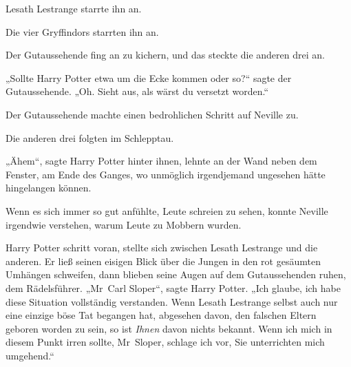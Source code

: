 Lesath Lestrange starrte ihn an.

Die vier Gryffindors starrten ihn an.

Der Gutaussehende fing an zu kichern, und das steckte die anderen drei an.

„Sollte Harry Potter etwa um die Ecke kommen oder so?“ sagte der Gutaussehende.
„Oh. Sieht aus, als wärst du versetzt worden.“

Der Gutaussehende machte einen bedrohlichen Schritt auf Neville zu.

Die anderen drei folgten im Schlepptau.

„Ähem“, sagte Harry Potter hinter ihnen, lehnte an der Wand neben dem Fenster, am Ende des Ganges, wo unmöglich irgendjemand ungesehen hätte hingelangen können.

Wenn es sich immer so gut anfühlte, Leute schreien zu sehen, konnte Neville irgendwie verstehen, warum Leute zu Mobbern wurden.

Harry Potter schritt voran, stellte sich zwischen Lesath Lestrange und die anderen. Er ließ seinen eisigen Blick über die Jungen in den rot gesäumten Umhängen schweifen, dann blieben seine Augen auf dem Gutaussehenden ruhen, dem Rädelsführer.
„Mr~Carl Sloper“, sagte Harry Potter.
„Ich glaube, ich habe diese Situation vollständig verstanden. Wenn Lesath Lestrange selbst auch nur eine einzige böse Tat begangen hat, abgesehen davon, den falschen Eltern geboren worden zu sein, so ist \emph{Ihnen} davon nichts bekannt. Wenn ich mich in diesem Punkt irren sollte, Mr~Sloper, schlage ich vor, Sie unterrichten mich umgehend.“

